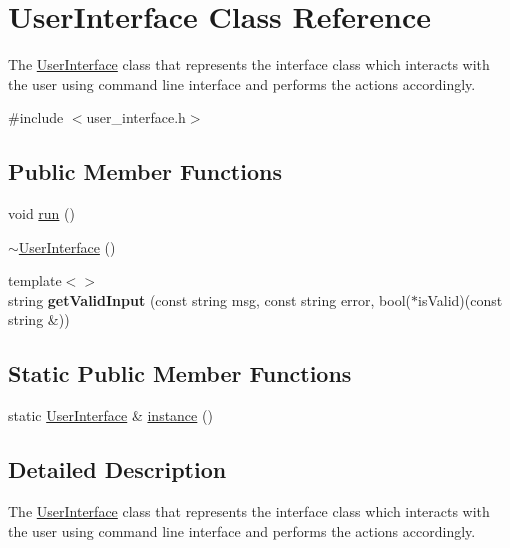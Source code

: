 \hypertarget{class_user_interface}{}\section{User\+Interface Class Reference}
\label{class_user_interface}


The \hyperlink{class_user_interface}{User\+Interface} class that represents the interface class which interacts with the user using command line interface and performs the actions accordingly.  




{\ttfamily \#include $<$user\+\_\+interface.\+h$>$}

\subsection*{Public Member Functions}
\begin{DoxyCompactItemize}
\item 
void \hyperlink{class_user_interface_a6d8d6d6b6900823be51259efba78b400}{run} ()
\item 
\hyperlink{class_user_interface_ae588b2ff1711a016dd4c6fc5002c0841}{$\sim$\+User\+Interface} ()
\item 
{\footnotesize template$<$$>$ }\\string {\bfseries get\+Valid\+Input} (const string msg, const string error, bool($\ast$is\+Valid)(const string \&))\hypertarget{class_user_interface_a38d3ddbfae6387902a83c7b39cbafc77}{}\label{class_user_interface_a38d3ddbfae6387902a83c7b39cbafc77}

\end{DoxyCompactItemize}
\subsection*{Static Public Member Functions}
\begin{DoxyCompactItemize}
\item 
static \hyperlink{class_user_interface}{User\+Interface} \& \hyperlink{class_user_interface_a86f141914035e21731b3058f8e3b17df}{instance} ()
\end{DoxyCompactItemize}


\subsection{Detailed Description}
The \hyperlink{class_user_interface}{User\+Interface} class that represents the interface class which interacts with the user using command line interface and performs the actions accordingly. 

